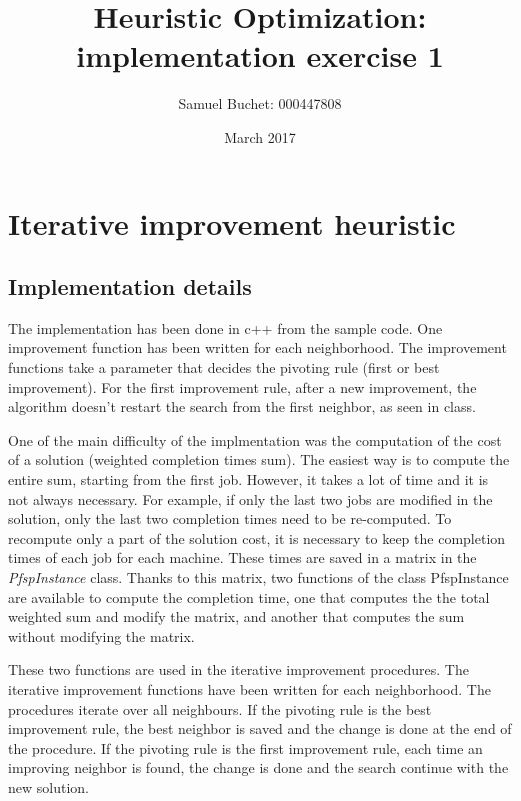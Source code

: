 \documentclass{article}
\title{Heuristic Optimization: implementation exercise 1}
\author{Samuel Buchet: 000447808}
\date{March 2017}
\begin{document}
\maketitle

\section{Iterative improvement heuristic}

\subsection{Implementation details}

The implementation has been done in c++ from the sample code.
One improvement function has been written for each neighborhood.
The improvement functions take a parameter that decides the pivoting rule (first or best improvement).
For the first improvement rule, after a new improvement, the algorithm doesn't restart the search from the first neighbor, as seen in class. \newline

One of the main difficulty of the implmentation was the computation of the cost of a solution (weighted completion times sum). The easiest way is to compute the entire sum, starting from the first job.
However, it takes a lot of time and it is not always necessary.
For example, if only the last two jobs are modified in the solution, only the last two completion times need to be re-computed.
To recompute only a part of the solution cost, it is necessary to keep the completion times of each job for each machine.
These times are saved in a matrix in the \textit{PfspInstance} class.
Thanks to this matrix, two functions of the class PfspInstance are available to compute the completion time, one that computes the the total weighted sum and modify the matrix, and another that computes the sum without modifying the matrix.\newline

These two functions are used in the iterative improvement procedures.
The iterative improvement functions have been written for each neighborhood.
The procedures iterate over all neighbours.
If the pivoting rule is the best improvement rule, the best neighbor is saved and the change is done at the end of the procedure.
If the pivoting rule is the first improvement rule, each time an improving neighbor is found, the change is done and the search continue with the new solution. \newline
\end{document}
